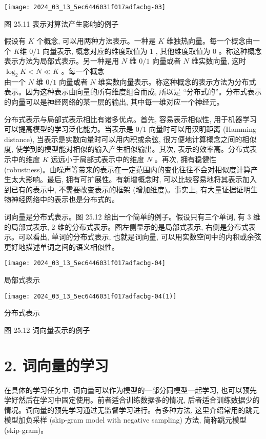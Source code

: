 \documentclass[10pt]{article}
\begin{document}
\begin{center}
\texttt{[image: 2024\_03\_13\_5ec6446031f017adfacbg-03]}
\end{center}

图 25.11 表示对算法产生影响的例子

假设有 $K$ 个概念, 可以用两种方法表示。一种是 $K$ 维独热向量。每一个概念由一个 $K$维 $0 / 1$ 向量表示, 概念对应的维度取值为 1 , 其他维度取值为 0 。称这种概念表示方法为局部式表示。另一种是用 $N$ 维 $0 / 1$ 向量或者 $N$ 维实数向量, 这时 $\log _{2} K<N \ll K$ 。每一个概念\\
由一个 $N$ 维 $0 / 1$ 向量或者 $N$ 维实数向量表示。称这种概念的表示方法为分布式表示。因为这种表示由向量的所有维度组合而成, 所以是 “分布式的”。分布式表示的向量可以是神经网络的某一层的输出, 其中每一维对应一个神经元。

分布式表示与局部式表示相比有诸多优点。首先, 容易表示相似性, 用于机器学习可以提高模型的学习泛化能力。当表示是 $0 / 1$ 向量时可以用汉明距离 (Hamming distance), 当表示是实数向量时可以用内积或余弦, 很方便地计算概念之间的相似度, 使学到的模型能对相似的输入产生相似输出。其次, 表示的效率高。分布式表示中的维度 $K$ 远远小于局部式表示中的维度 $N$ 。再次, 拥有稳健性 (robustness)。由噪声等带来的表示在一定范围内的变化往往不会对相似度计算产生太大影响。最后, 拥有可扩展性。有新增概念时, 可以比较容易地将其表示加入到已有的表示中, 不需要改变表示的框架 (增加维度)。事实上, 有大量证据证明生物神经网络中的表示也是分布式的。

词向量是分布式表示。图 25.12 给出一个简单的例子。假设只有三个单词, 有 3 维的局部式表示, 2 维的分布式表示。图左侧显示的是局部式表示, 右侧是分布式表示。可以看出, 单词的分布式表示, 也就是词向量, 可以用实数空间中的内积或余弦更好地描述单词之间的语义相似性。

\begin{center}
\texttt{[image: 2024\_03\_13\_5ec6446031f017adfacbg-04]}
\end{center}

局部式表示

\begin{center}
\texttt{[image: 2024\_03\_13\_5ec6446031f017adfacbg-04(1)]}
\end{center}

分布式表示

图 25.12 词向量表示的例子

\section*{2. 词向量的学习}
在具体的学习任务中, 词向量可以作为模型的一部分同模型一起学习, 也可以预先学好然后在学习中固定使用。前者适合训练数据多的情况, 后者适合训练数据少的情况。词向量的预先学习通过无监督学习进行。有多种方法, 这里介绍常用的跳元模型加负采样 (skip-gram model with negative sampling) 方法, 简称跳元模型 (skip-gram)。
\end{document}
